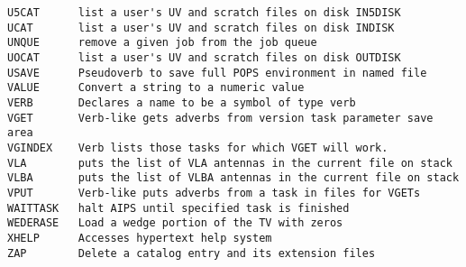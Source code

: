 \begin{verbatim}
U5CAT      list a user's UV and scratch files on disk IN5DISK
UCAT       list a user's UV and scratch files on disk INDISK
UNQUE      remove a given job from the job queue
UOCAT      list a user's UV and scratch files on disk OUTDISK
USAVE      Pseudoverb to save full POPS environment in named file
VALUE      Convert a string to a numeric value
VERB       Declares a name to be a symbol of type verb
VGET       Verb-like gets adverbs from version task parameter save area
VGINDEX    Verb lists those tasks for which VGET will work.
VLA        puts the list of VLA antennas in the current file on stack
VLBA       puts the list of VLBA antennas in the current file on stack
VPUT       Verb-like puts adverbs from a task in files for VGETs
WAITTASK   halt AIPS until specified task is finished
WEDERASE   Load a wedge portion of the TV with zeros
XHELP      Accesses hypertext help system
ZAP        Delete a catalog entry and its extension files
\end{verbatim}\eve

\vfill\eject
{}

